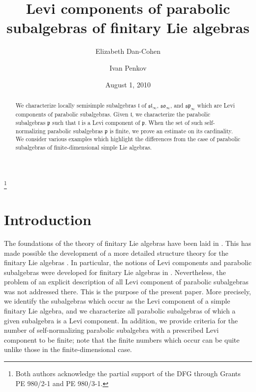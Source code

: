 \documentclass{amsart}
\theoremstyle{definition}
\theoremstyle{remark}
\numberwithin{equation}{section}
\def\l{\mathfrak {l}}
\def\p{\mathfrak {p}}
\def\sl{\mathfrak{sl}}
\def\so{\mathfrak{so}}
\def\sp{\mathfrak{sp}}
\begin{document}
\title{Levi components of parabolic subalgebras of finitary Lie algebras}

\author{Elizabeth Dan-Cohen}
\address{Jacobs University Bremen, Campus Ring 1, 28759 Bremen, Germany}

\author{Ivan Penkov}
\address{Jacobs University Bremen, Campus Ring 1, 28759 Bremen, Germany}

\thanks{Both authors acknowledge the partial support of the DFG through Grants PE 980/2-1 and PE 980/3-1.}


\date{August 1, 2010}


\begin{abstract}
We characterize locally semisimple subalgebras $\l$ of $\sl_\infty$, $\so_\infty$, and $\sp_\infty$ which are Levi components of parabolic subalgebras.  Given $\l$, we characterize the parabolic subalgebras $\p$ such that $\l$ is a Levi component of $\p$.  When the set of such self-normalizing parabolic subalgebras $\p$ is finite, we prove an estimate on its cardinality.  We consider various examples which highlight the differences from the case of parabolic subalgebras of finite-dimensional simple Lie algebras.
\end{abstract}

\maketitle

\section{Introduction}


The foundations of the theory of finitary Lie algebras have been laid in \cite{Baranov1, Baranov2, BaranovStrade, PStrade}.  This has made possible the development of a more detailed structure theory for the finitary Lie algebras \cite{NeebP, DPSnyder, DimitrovP1, D, DP, DPWolf, DimitrovP2}.  In particular, the notions of Levi components and parabolic subalgebras were developed for finitary Lie algebras in \cite{DP}.  Nevertheless, the problem of an explicit description of all Levi component of parabolic subalgebras was not addressed there.  This is the purpose of the present paper.  More precisely, we identify the subalgebras which occur as the Levi component of a simple finitary Lie algebra, and we characterize all parabolic subalgebras of which a given subalgebra is a Levi component.  In addition,  we provide criteria for the number of self-normalizing parabolic subalgebra with a prescribed Levi component to be finite; note that the finite numbers which occur can be quite unlike those in the finite-dimensional case. 
\end{document}
